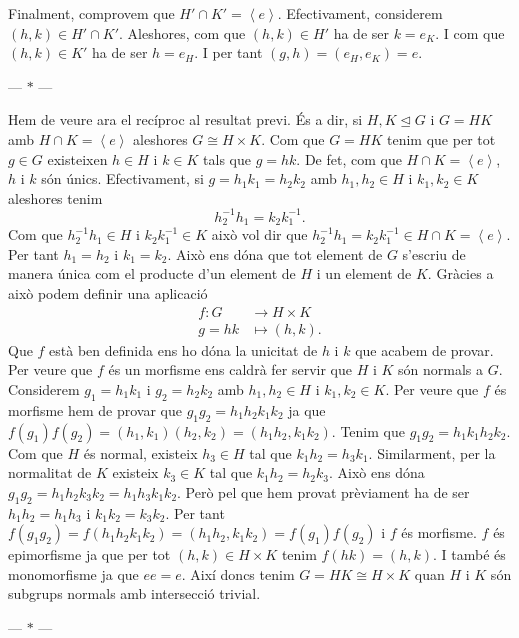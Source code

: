 \documentclass[12pt]{article}
\newcommand{\gen}[1]{\left\langle #1 \right\rangle}
\newcommand{\normal}{\trianglelefteq}
\newcommand{\parbreak}{
	\begin{center}
		--- $\ast$ ---
	\end{center} 
}
\begin{document}
Finalment, comprovem que \( H' \cap K' = \gen{e} \). Efectivament, considerem \( (h,k) \in H' \cap K' \). Aleshores, com que \( (h,k) \in H' \) ha de ser \( k = e_K \). I com que \( (h,k) \in K' \) ha de ser \( h = e_H \). I per tant \( (g,h) = (e_H, e_K) = e \).

\parbreak

Hem de veure ara el recíproc al resultat previ. És a dir, si \( H,K \normal G \) i \( G = HK \) amb \( H \cap K = \gen{e} \) aleshores \( G \cong H \times K \). Com que \( G = HK \) tenim que per tot \( g \in G \) existeixen \( h\in H \) i \( k \in K \) tals que \( g= hk \). De fet, com que \( H \cap K = \gen{e} \), \( h \) i \( k \) són únics. Efectivament, si \( g = h_1k_1 = h_2k_2 \) amb \( h_1,h_2 \in H \) i \( k_1,k_2 \in K \) aleshores tenim  
\begin{equation*}
h_2^{-1}h_1 = k_2k_1^{-1}.
\end{equation*}
Com que \( h_2^{-1}h_1 \in H \) i \( k_2k_1^{-1} \in K \) això vol dir que \( h_2^{-1}h_1 = k_2k_1^{-1} \in H \cap K = \gen{e} \). Per tant \( h_1 = h_2 \) i \( k_1 = k_2 \). Això ens dóna que tot element de \( G \) s'escriu de manera única com el producte d'un element de \( H \) i un element de \( K \). Gràcies a això podem definir una aplicació 
\begin{align*}
	f \colon G & \longrightarrow H \times K \\
	g = hk & \longmapsto (h,k).
\end{align*}
Que \( f \) està ben definida ens ho dóna la unicitat de \( h \) i \( k \) que acabem de provar. Per veure que \( f \) és un morfisme ens caldrà fer servir que \( H \) i \( K \) són normals a \( G \). Considerem \( g_1 = h_1k_1 \) i \( g_2 = h_2k_2 \) amb \( h_1,h_2 \in H \) i \( k_1,k_2 \in K \). Per veure que \( f \) és morfisme hem de provar que \( g_1g_2 = h_1h_2k_1k_2 \) ja que \( f(g_1)f(g_2) = (h_1,k_1)(h_2,k_2) = (h_1h_2,k_1k_2) \). Tenim que \( g_1g_2 = h_1k_1h_2k_2 \). Com que \( H \) és normal, existeix \( h_3 \in H \) tal que \( k_1h_2 = h_3k_1 \). Similarment, per la normalitat de \( K \) existeix \( k_3 \in K \) tal que \( k_1h_2 = h_2k_3 \). Això ens dóna \( g_1g_2 = h_1h_2k_3k_2 = h_1h_3k_1k_2 \). Però pel que hem provat prèviament ha de ser \( h_1h_2 = h_1h_3 \) i \( k_1k_2 = k_3k_2 \). Per tant \( f(g_1g_2) = f(h_1h_2k_1k_2) = (h_1h_2,k_1k_2) = f(g_1)f(g_2) \) i \( f \) és morfisme. \( f \) és epimorfisme ja que per tot \( (h,k) \in H \times K \) tenim \( f(hk) = (h,k) \). I també és monomorfisme ja que \( ee = e \). Així doncs tenim \( G = HK \cong H \times K \) quan \( H \) i \( K \) són subgrups normals amb intersecció trivial.

\parbreak
\end{document}

